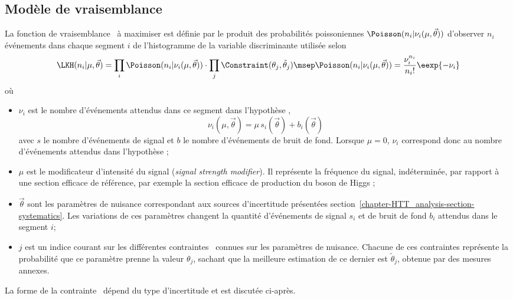 \subsection{Modèle de vraisemblance}\label{chapter-HTT_analysis-section-signal_extraction-likelihood}
La fonction de vraisemblance \LKH\ à maximiser est définie par
le produit des probabilités poissoniennes $\Poisson (n_i | \nu_i(\mu,\vec{\theta}))$ d'observer $n_i$ événements dans chaque segment $i$ de l'histogramme de la variable discriminante utilisée
selon
\begin{equation}
\LKH(n_i | \mu,\vec{\theta})
=
\prod_i \Poisson(n_i | \nu_i(\mu,\vec{\theta}))
\cdot
\prod_j \Constraint(\theta_j, \tilde{\theta}_j)
\msep
\Poisson(n_i | \nu_i(\mu,\vec{\theta}))
=
\frac{\nu_i^{n_i}}{{n_i}!}\eexp{-\nu_i}
\end{equation}
où
\begin{itemize}
\item $\nu_i$ est le nombre d'événements attendus dans ce segment dans l'hypothèse \hypSB, \ie
\begin{equation}
\nu_i(\mu,\vec{\theta}) = \mu \, s_i(\vec{\theta}) + b_i(\vec{\theta})
\end{equation}
avec
$s$ le nombre d'événements de signal
et
$b$ le nombre d'événements de bruit de fond.
Lorsque $\mu=0$, $\nu_i$ correspond donc au nombre d'événements attendus dans l'hypothèse \hypB;
\item $\mu$ est le modificateur d'intensité du signal (\emph{signal strength modifier}).
Il représente la fréquence du signal, indéterminée, par rapport à une section efficace de référence, par exemple la section efficace de production du boson de Higgs \higgs;
\item $\vec{\theta}$ sont les paramètres de nuisance correspondant aux sources d'incertitude présentées section~\ref{chapter-HTT_analysis-section-systematics}.
Les variations de ces paramètres changent la quantité d'événements de signal $s_i$ et de bruit de fond $b_i$ attendus dans le segment $i$;
\item $j$ est un indice courant sur les différentes contraintes \Constraint\ connues sur les paramètres de nuisance.
Chacune de ces contraintes représente la probabilité que ce paramètre prenne la valeur $\theta_j$, sachant que la meilleure estimation de ce dernier est $\tilde{\theta}_j$, obtenue par des mesures annexes.
\end{itemize}
La forme de la contrainte \Constraint\ dépend du type d'incertitude et est discutée ci-après.
